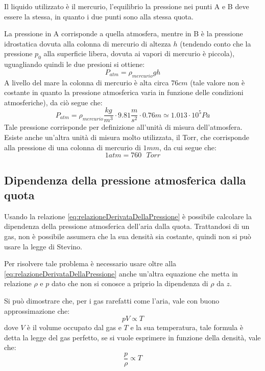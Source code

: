 \documentclass[11pt, a4paper, openright]{book}
\theoremstyle{plain}
\theoremstyle{definition}
\begin{document}
Il liquido utilizzato è il mercurio, l'equilibrio la pressione nei punti A e B deve essere la stessa, in quanto i due punti sono alla stessa quota.

La pressione in A corrisponde a quella atmosfera, mentre in B è la pressione idrostatica dovuta alla colonna di mercurio di altezza $h$ (tendendo conto che la pressione $p_0$ alla superficie libera, dovuta ai vapori di mercurio è piccola), uguagliando quindi le due presioni si ottiene:
\begin{equation}
    P_{atm} = \rho_{mercurio} g h
\end{equation}
A livello del mare la colonna di mercurio è alta circa $76cm$ (tale valore non è costante in quanto la pressione atmosferica varia in funzione delle condizioni atmosferiche), da ciò segue che:
\begin{equation}
    P_{atm} = \rho_{mercurio} \frac{kg}{m^3} \cdot 9.81 \frac{m}{s^2} \cdot 0.76 m \simeq 1.013 \cdot 10^5 Pa
\end{equation}
Tale pressione corrisponde per definizione all'unità di misura dell'atmosfera. Esiste anche un'altra unità di misura molto utilizzata, il Torr, che corrisponde alla pressione di una colonna di mercurio di $1 mm$, da cui segue che:
\begin{equation}
    1 atm = 760 \text{ } Torr
\end{equation}

\subsection{Dipendenza della pressione atmosferica dalla quota}
Usando la relazione \ref{eq:relazioneDerivataDellaPressione} è possibile calcolare la dipendenza della pressione atmosferica dell'aria dalla quota.
Trattandosi di un gas, non è possibile assumera che la sua densità sia costante, quindi non si può usare la legge di Stevino.

Per risolvere tale problema è necessario usare oltre alla \ref{eq:relazioneDerivataDellaPressione} anche un'altra equazione che metta in relazione $\rho$ e $p$ dato che non si conosce a priprio la dipendenza di $\rho$ da $z$.

Si può dimostrare che, per i gas rarefatti come l'aria, vale con buono approssimazione che:
\begin{equation}
    pV \propto T
    \label{eq:leggeDelGasPerfetto}
\end{equation}
dove $V$ è il volume occupato dal gas e $T$ e la sua temperatura, tale formula è detta la legge del gas perfetto, se si vuole esprimere in funzione della densità, vale che:
\begin{equation}
    \frac{p}{\rho} \propto T
\end{equation}
\end{document}
